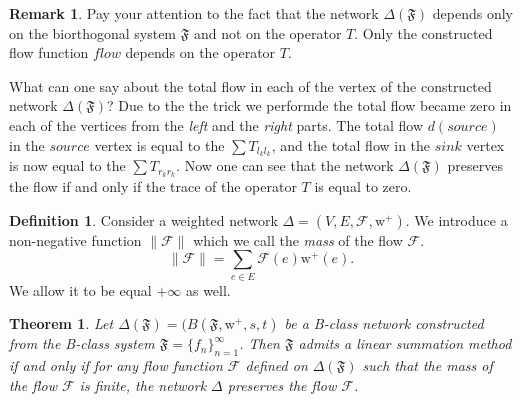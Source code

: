 \documentclass[12pt]{article}
\newtheorem{theorem}{Theorem}
\theoremstyle{definition}
\newtheorem{remark}{Remark}
\newtheorem{definition}{Definition}
\newcommand{\seq}[1]{\{{#1}_n\}_{n=1}^\infty}
\newcommand{\fsys}{\mathfrak{F}}
\newcommand{\wtp}{\mathrm{w}^{+}}
\newcommand{\flow}{\mathcal{F}}
\newcommand{\flowsgn}{\flow}
\newcommand{\source}{\mathit{source}}
\newcommand{\sink}{\mathit{sink}}
\newcommand{\net}{\Delta}
\newcommand{\onet}{\vec{\Delta}}
\numberwithin{remark}{section}
\numberwithin{theorem}{section}
\numberwithin{prop}{section}
\numberwithin{equation}{section}
\numberwithin{lemma}{section}
\numberwithin{prop_under_lemma}{lemma}
\begin{document}
    \begin{remark}
      Pay your attention to the fact that the network $\net(\fsys)$
      depends only on the biorthogonal system $\fsys$ and not on the operator $T$.
      Only the constructed flow function $flow$ depends on the operator $T$.
    \end{remark}
    What can one say about the total flow in each of the vertex of the constructed network $\net(\fsys)$?
    Due to the the trick we performde the total flow became zero in each of the vertices from the \textit{left} and the \textit{right} parts.
    The total flow $d(\source)$ in the $\source$ vertex is equal to the $\sum T_{l_k l_k}$, and the total flow in the
    $\sink$ vertex is now equal to the $\sum T_{r_k r_k}$.
    Now one can see that the network $\net(\fsys)$ preserves the flow if and only if the trace of the operator $T$ is equal to
    zero.
    \begin{definition}
      Consider a weighted network $\net = (V, E, \flow, \wtp)$.
      We introduce a non-negative function $\|\flow\|$ which we call the \emph{mass} of the flow $\flow$.
      $$
        \|\flow\| = \sum_{e \in E} \flow(e) \wtp(e).
      $$
      We allow it to be equal $+\infty$ as well.
    \end{definition}
    \begin{theorem}
      \label{thm-graph-eq}
        Let $\net(\fsys) = (B(\fsys, \wtp, s, t)$ be a B-class network constructed
          from the B-class system $\fsys = \seq{f}$.
        Then $\fsys$ admits a linear summation method if and only if for any 
          flow function $\flow$ defined on $\net(\fsys)$ such that
          the mass of the flow $\flow$ is finite,
          the network $\net$ \emph{preserves} the flow $\flow$.
    \end{theorem}
\end{document}
